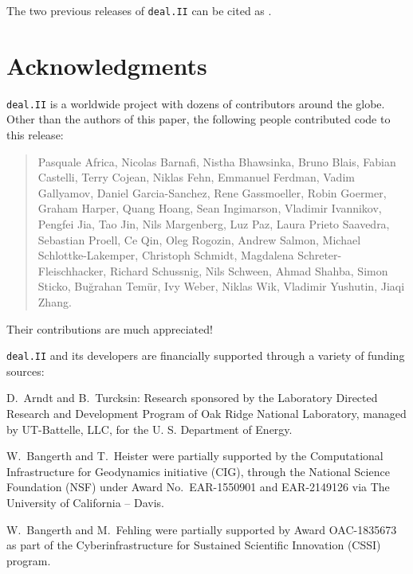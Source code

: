 \documentclass{ansarticle-preprint}
\newcommand{\specialword}[1]{\texttt{#1}}
\newcommand{\dealii}{{\specialword{deal.II}}\xspace}
\begin{document}
The two previous releases of \dealii can be cited as
\cite{dealII92,dealII93}.


\section{Acknowledgments}

\dealii is a worldwide project with dozens of contributors around the
globe. Other than the authors of this paper, the following people
contributed code to this release:\\
%
%

\begin{quote}
Pasquale    Africa,
Nicolas     Barnafi,
Nistha      Bhawsinka,
Bruno       Blais,
Fabian      Castelli,
Terry       Cojean,
Niklas      Fehn,
Emmanuel    Ferdman,
Vadim       Gallyamov,
Daniel      Garcia-Sanchez,
Rene        Gassmoeller,
Robin       Goermer,
Graham      Harper,
Quang       Hoang,
Sean        Ingimarson,
Vladimir    Ivannikov,
Pengfei     Jia,
Tao         Jin,
Nils        Margenberg,
Luz         Paz,
Laura       Prieto Saavedra,
Sebastian   Proell,
Ce          Qin,
Oleg        Rogozin,
Andrew      Salmon,
Michael     Schlottke-Lakemper,
Christoph   Schmidt,
Magdalena   Schreter-Fleischhacker,
Richard     Schussnig,
Nils        Schween,
Ahmad       Shahba,
Simon       Sticko,
Buğrahan    Temür,
Ivy         Weber,
Niklas      Wik,
Vladimir    Yushutin,
Jiaqi       Zhang.
\end{quote}
Their contributions are much appreciated!


\bigskip

\dealii and its developers are financially supported through a
variety of funding sources:

D.~Arndt and B.~Turcksin: Research sponsored by the Laboratory Directed Research and
Development Program of Oak Ridge National Laboratory, managed by UT-Battelle,
LLC, for the U. S. Department of Energy.

W.~Bangerth and T.~Heister were partially
supported by the Computational Infrastructure for Geodynamics initiative
(CIG), through the National Science Foundation (NSF) under Award
No.~EAR-1550901 and EAR-2149126 via The University of California -- Davis.

W.~Bangerth and M.~Fehling were partially supported by Award OAC-1835673
as part of the Cyberinfrastructure for Sustained Scientific Innovation (CSSI)
program.
\end{document}
